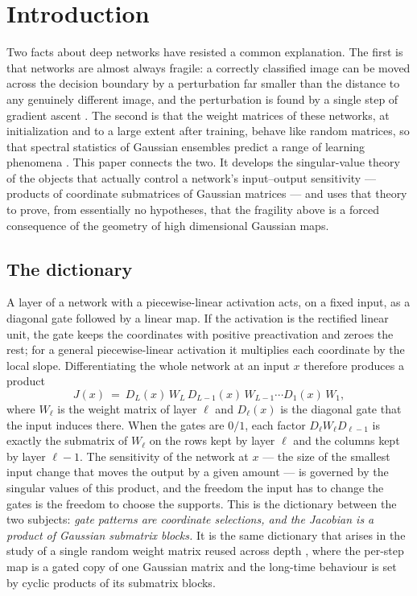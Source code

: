 \documentclass[11pt,reqno]{amsart}
\theoremstyle{plain}
\theoremstyle{definition}
\theoremstyle{remark}
\begin{document}
\tableofcontents

\section{Introduction}\label{sec:intro}

Two facts about deep networks have resisted a common explanation. The first is that networks are
almost always fragile: a correctly classified image can be moved across the decision boundary by a
perturbation far smaller than the distance to any genuinely different image, and the perturbation is
found by a single step of gradient ascent \cite{szegedy14,goodfellow15}. The second is that the
weight matrices of these networks, at initialization and to a large extent after training, behave
like random matrices, so that spectral statistics of Gaussian ensembles predict a range of learning
phenomena \cite{shmaloRMT,shmaloAccuracy}. This paper connects the two. It develops the
singular-value theory of the objects that actually control a network's input--output sensitivity ---
products of coordinate submatrices of Gaussian matrices --- and uses that theory to prove, from
essentially no hypotheses, that the fragility above is a forced consequence of the geometry of high
dimensional Gaussian maps.

\subsection{The dictionary}
A layer of a network with a piecewise-linear activation acts, on a fixed input, as a diagonal gate
followed by a linear map. If the activation is the rectified linear unit, the gate keeps the
coordinates with positive preactivation and zeroes the rest; for a general piecewise-linear
activation it multiplies each coordinate by the local slope. Differentiating the whole network at an
input $x$ therefore produces a product
\[
  J(x)\ =\ D_L(x)\,W_L\,D_{L-1}(x)\,W_{L-1}\cdots D_1(x)\,W_1,
\]
where $W_\ell$ is the weight matrix of layer $\ell$ and $D_\ell(x)$ is the diagonal gate that the
input induces there. When the gates are $0/1$, each factor $D_\ell W_\ell D_{\ell-1}$ is exactly the
submatrix of $W_\ell$ on the rows kept by layer $\ell$ and the columns kept by layer $\ell-1$. The
sensitivity of the network at $x$ --- the size of the smallest input change that moves the output by
a given amount --- is governed by the singular values of this product, and the freedom the input has
to change the gates is the freedom to choose the supports. This is the dictionary between the two
subjects: \emph{gate patterns are coordinate selections, and the Jacobian is a product of Gaussian
submatrix blocks.} It is the same dictionary that arises in the study of a single random weight
matrix reused across depth \cite{relumap}, where the per-step map is a gated copy of one Gaussian
matrix and the long-time behaviour is set by cyclic products of its submatrix blocks.
\end{document}
